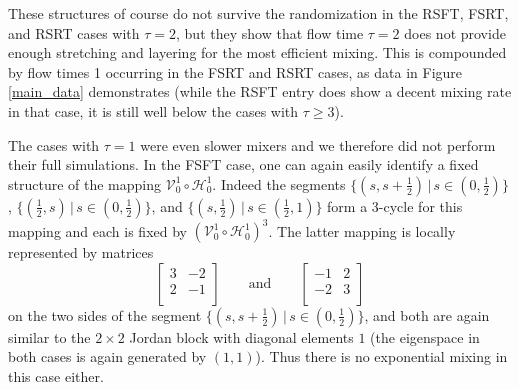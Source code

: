 \documentclass[12pt]{article}
\numberwithin{figure}{section}
\numberwithin{equation}{section}
\newcommand{\calH}{{\mathcal{H}}}
\newcommand{\calV}{{\mathcal{V}}}
\begin{document}
These structures of course do not survive the randomization in the RSFT, FSRT, and RSRT cases with $\tau=2$, but they show that flow time $\tau=2$ does not provide enough stretching and layering for the most efficient mixing.  This is compounded by flow times 1 occurring in the FSRT and RSRT cases, as data in Figure \ref{main_data} demonstrates (while the RSFT entry does show a decent mixing rate in that case, it is still well below the cases with $\tau\ge 3$).

The cases with $\tau=1$ were even slower mixers and we therefore did not perform their full simulations.  In the FSFT case, one can again easily identify a fixed structure of the mapping $\calV_{0}^{1} \circ \calH_{0}^{1}$.  Indeed the segments $\{(s,s+\frac 12)\,|\,s\in (0,\frac 12)\}$, $\{(\frac 12,s)\,|\,s\in (0,\frac 12)\}$, and $\{(s,\frac 12)\,|\,s\in (\frac 12,1)\}$ form a 3-cycle for this mapping and each is fixed by $(\calV_{0}^{1} \circ \calH_{0}^{1})^3$.  The latter mapping is locally represented by matrices
\[
\begin{bmatrix}
            3 & -2 \\
            2 & -1 \\
\end{bmatrix}
\qquad \text{and} \qquad 
\begin{bmatrix}
            -1 & 2 \\
            -2 & 3 \\
\end{bmatrix}
\]
on the two sides of the segment $\{(s,s+\frac 12)\,|\,s\in (0,\frac 12)\}$, and both are again similar to the $2\times 2$ Jordan block with diagonal elements $1$ (the eigenspace in both cases is again generated by $(1,1)$).  Thus there is no exponential mixing in this case either.
\end{document}
